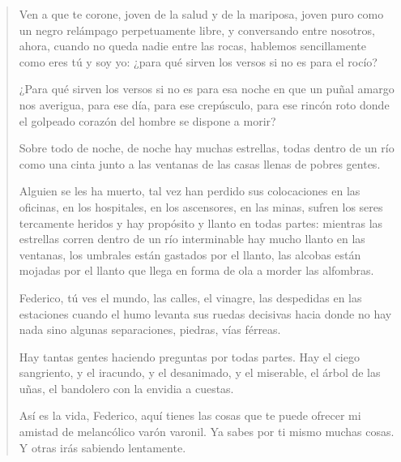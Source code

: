 \documentclass[12pt]{article}
\begin{document}
\begin{verse}
Ven a que te corone, joven de la salud
y de la mariposa, joven puro
como un negro relámpago perpetuamente libre,
y conversando entre nosotros,
ahora, cuando no queda nadie entre las rocas,
hablemos sencillamente como eres tú y soy yo:
¿para qué sirven los versos si no es para el rocío?

¿Para qué sirven los versos si no es para esa noche
en que un puñal amargo nos averigua, para ese día,
para ese crepúsculo, para ese rincón roto
donde el golpeado corazón del hombre se dispone a morir?

Sobre todo de noche,
de noche hay muchas estrellas,
todas dentro de un río
como una cinta junto a las ventanas
de las casas llenas de pobres gentes.

Alguien se les ha muerto, tal vez
han perdido sus colocaciones en las oficinas,
en los hospitales, en los ascensores,
en las minas,
sufren los seres tercamente heridos
y hay propósito y llanto en todas partes:
mientras las estrellas corren dentro de un río interminable
hay mucho llanto en las ventanas,
los umbrales están gastados por el llanto,
las alcobas están mojadas por el llanto
que llega en forma de ola a morder las alfombras.

Federico,
tú ves el mundo, las calles,
el vinagre,
las despedidas en las estaciones
cuando el humo levanta sus ruedas decisivas
hacia donde no hay nada sino algunas
separaciones, piedras, vías férreas.

Hay tantas gentes haciendo preguntas
por todas partes.
Hay el ciego sangriento, y el iracundo, y el
desanimado,
y el miserable, el árbol de las uñas,
el bandolero con la envidia a cuestas.

Así es la vida, Federico, aquí tienes
las cosas que te puede ofrecer mi amistad
de melancólico varón varonil.
Ya sabes por ti mismo muchas cosas.
Y otras irás sabiendo lentamente.

\end{verse}
\end{document}
